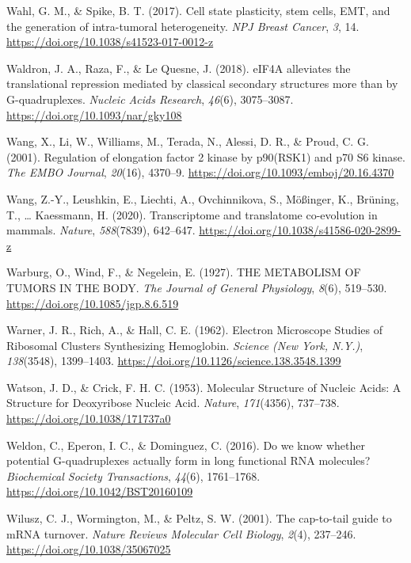 \documentclass[12pt,openany]{book}
\begin{document}
\hypertarget{ref-Wahl2017}{}
Wahl, G. M., \& Spike, B. T. (2017). Cell state plasticity, stem cells,
EMT, and the generation of intra-tumoral heterogeneity. \emph{NPJ Breast
Cancer}, \emph{3}, 14. \url{https://doi.org/10.1038/s41523-017-0012-z}

\hypertarget{ref-Waldron2018}{}
Waldron, J. A., Raza, F., \& Le Quesne, J. (2018). eIF4A alleviates the
translational repression mediated by classical secondary structures more
than by G-quadruplexes. \emph{Nucleic Acids Research}, \emph{46}(6),
3075--3087. \url{https://doi.org/10.1093/nar/gky108}

\hypertarget{ref-Wang2001}{}
Wang, X., Li, W., Williams, M., Terada, N., Alessi, D. R., \& Proud, C.
G. (2001). Regulation of elongation factor 2 kinase by p90(RSK1) and p70
S6 kinase. \emph{The EMBO Journal}, \emph{20}(16), 4370--9.
\url{https://doi.org/10.1093/emboj/20.16.4370}

\hypertarget{ref-Wang2020}{}
Wang, Z.-Y., Leushkin, E., Liechti, A., Ovchinnikova, S., Mößinger, K.,
Brüning, T., \ldots{} Kaessmann, H. (2020). Transcriptome and
translatome co-evolution in mammals. \emph{Nature}, \emph{588}(7839),
642--647. \url{https://doi.org/10.1038/s41586-020-2899-z}

\hypertarget{ref-Warburg1927}{}
Warburg, O., Wind, F., \& Negelein, E. (1927). THE METABOLISM OF TUMORS
IN THE BODY. \emph{The Journal of General Physiology}, \emph{8}(6),
519--530. \url{https://doi.org/10.1085/jgp.8.6.519}

\hypertarget{ref-Warner1962}{}
Warner, J. R., Rich, A., \& Hall, C. E. (1962). Electron Microscope
Studies of Ribosomal Clusters Synthesizing Hemoglobin. \emph{Science
(New York, N.Y.)}, \emph{138}(3548), 1399--1403.
\url{https://doi.org/10.1126/science.138.3548.1399}

\hypertarget{ref-Watson1953}{}
Watson, J. D., \& Crick, F. H. C. (1953). Molecular Structure of Nucleic
Acids: A Structure for Deoxyribose Nucleic Acid. \emph{Nature},
\emph{171}(4356), 737--738. \url{https://doi.org/10.1038/171737a0}

\hypertarget{ref-Weldon2016}{}
Weldon, C., Eperon, I. C., \& Dominguez, C. (2016). Do we know whether
potential G-quadruplexes actually form in long functional RNA molecules?
\emph{Biochemical Society Transactions}, \emph{44}(6), 1761--1768.
\url{https://doi.org/10.1042/BST20160109}

\hypertarget{ref-Wilusz2001}{}
Wilusz, C. J., Wormington, M., \& Peltz, S. W. (2001). The cap-to-tail
guide to mRNA turnover. \emph{Nature Reviews Molecular Cell Biology},
\emph{2}(4), 237--246. \url{https://doi.org/10.1038/35067025}
\end{document}
